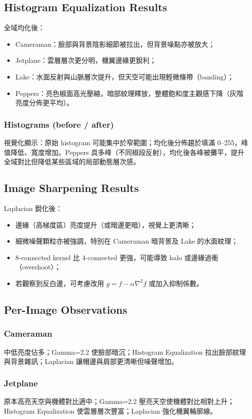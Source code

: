 \documentclass[12pt,a4paper]{article}
\begin{document}
\subsection{Histogram Equalization Results}
全域均化後：
\begin{itemize}
  \item Cameraman：臉部與背景陰影細節被拉出，但背景噪點亦被放大；
  \item Jetplane：雲層層次更分明，機翼邊緣更銳利；
  \item Lake：水面反射與山脈層次提升，但天空可能出現輕微條帶（banding）；
  \item Peppers：亮色椒面高光壓縮，暗部紋理釋放，整體飽和度主觀感下降（灰階亮度分佈更平均）。
\end{itemize}
\subsubsection{Histograms (before / after)}
視覺化顯示：原始 histogram 可能集中於窄範圍；均化後分佈趨於填滿 0--255，峰值降低、寬度增加。Peppers 具多峰（不同椒段反射），均化後各峰被攤平，提升全域對比但降低某些區域的局部動態層次感。
\subsection{Image Sharpening Results}
Laplacian 銳化後：
\begin{itemize}
  \item 邊緣（高梯度區）亮度提升（或暗邊更暗），視覺上更清晰；
  \item 細微噪聲顆粒亦被強調，特別在 Cameraman 暗背景及 Lake 的水面紋理；
  \item 8-connected kernel 比 4-connected 更強，可能導致 halo 或邊緣過衝（overshoot）；
  \item 若觀察到反白邊，可考慮改用 \(g = f - \alpha \nabla^2 f\) 或加入抑制係數。
\end{itemize}
\subsection{Per-Image Observations}
\subsubsection{Cameraman} 中低亮度佔多；Gamma=2.2 使臉部暗沉；Histogram Equalization 拉出臉部紋理與背景雜訊；Laplacian 讓帽邊與肩部更清晰但噪聲增加。
\subsubsection{Jetplane} 原本高亮天空與機體對比適中；Gamma=2.2 壓亮天空使機體對比相對上升；Histogram Equalization 使雲層層次豐富；Laplacian 強化機翼輪廓線。
\end{document}
